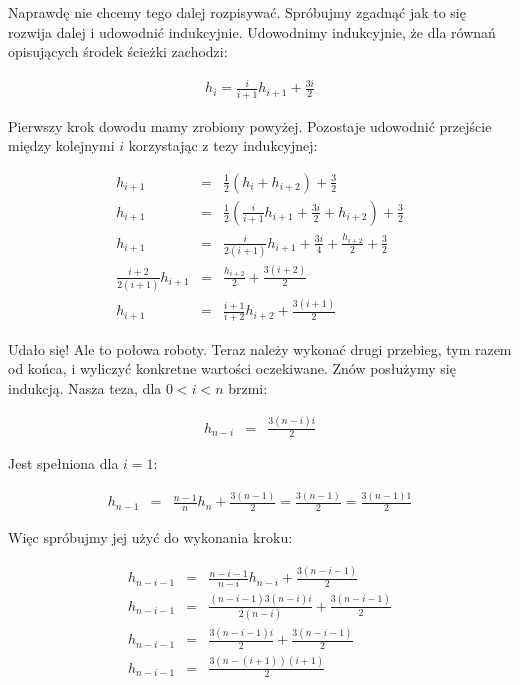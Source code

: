 \documentclass[a4paper,11pt]{article}
\begin{document}
Naprawdę nie chcemy tego dalej rozpisywać. Spróbujmy zgadnąć jak to się rozwija
dalej i udowodnić indukcyjnie. Udowodnimy indukcyjnie, że dla równań opisujących
środek ścieżki zachodzi:

\begin{eqnarray}
  \nonumber h_{i} = \frac{i}{i+1}h_{i+1} + \frac{3i}{2}
\end{eqnarray}

Pierwszy krok dowodu mamy zrobiony powyżej. Pozostaje udowodnić przejście między
kolejnymi $i$ korzystając z tezy indukcyjnej:

\begin{eqnarray}
  \nonumber h_{i + 1} & = & \frac{1}{2}(h_{i} + h_{i+2}) + \frac{3}{2}\\
  \nonumber h_{i + 1} & = & \frac{1}{2}(\frac{i}{i+1}h_{i+1} + \frac{3i}{2}
    + h_{i+2}) + \frac{3}{2} \\
  \nonumber h_{i + 1} & = & \frac{i}{2(i+1)}h_{i+1} + \frac{3i}{4}
    + \frac{h_{i+2}}{2} + \frac{3}{2} \\
  \nonumber \frac{i + 2}{2(i + 1)}h_{i+1} & = & \frac{h_{i+2}}{2}
    + \frac{3(i + 2)}{2} \\
  \nonumber h_{i+1} & = & \frac{i + 1}{i + 2}h_{i + 2} + \frac{3(i + 1)}{2}
\end{eqnarray}

Udało się! Ale to połowa roboty. Teraz należy wykonać drugi przebieg, tym razem
od końca, i wyliczyć konkretne wartości oczekiwane. Znów posłużymy się indukcją.
Nasza teza, dla $0 < i < n$ brzmi:

\begin{eqnarray}
  \nonumber h_{n-i} & = & \frac{3(n - i)i}{2}
\end{eqnarray}

Jest spełniona dla $i = 1$:

\begin{eqnarray}
  \nonumber h_{n-1} & = & \frac{n-1}{n}h_{n} + \frac{3(n-1)}{2} =
    \frac{3(n-1)}{2} = \frac{3(n-1)1}{2}
\end{eqnarray}

Więc spróbujmy jej użyć do wykonania kroku:

\begin{eqnarray}
  \nonumber h_{n-i-1} & = & \frac{n-i-1}{n-i}h_{n-i} + \frac{3(n - i - 1)}{2} \\
  \nonumber h_{n-i-1} & = & \frac{(n-i-1)3(n-i)i}{2(n-i)} +
    \frac{3(n - i - 1)}{2} \\
  \nonumber h_{n-i-1} & = & \frac{3(n-i-1)i}{2} + \frac{3(n - i - 1)}{2} \\
  \nonumber h_{n-i-1} & = & \frac{3(n-(i+1))(i + 1)}{2}
\end{eqnarray}
\end{document}
